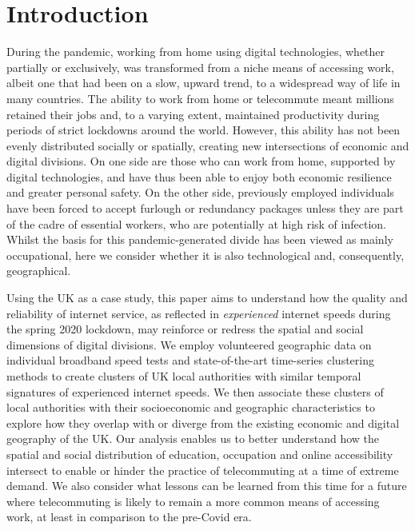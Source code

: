 \documentclass[]{interact}
\theoremstyle{plain}%
\theoremstyle{definition}
\theoremstyle{remark}
\begin{document}
\hypertarget{sec:1}{%
\section{Introduction}\label{sec:1}}

During the pandemic, working from home using digital technologies,
whether partially or exclusively, was transformed from a niche means of
accessing work, albeit one that had been on a slow, upward trend, to a
widespread way of life in many countries. The ability to work from home
or telecommute meant millions retained their jobs and, to a varying
extent, maintained productivity during periods of strict lockdowns
around the world. However, this ability has not been evenly distributed
socially or spatially, creating new intersections of economic and
digital divisions. On one side are those who can work from home,
supported by digital technologies, and have thus been able to enjoy both
economic resilience and greater personal safety. On the other side,
previously employed individuals have been forced to accept furlough or
redundancy packages unless they are part of the cadre of essential
workers, who are potentially at high risk of infection. Whilst the basis
for this pandemic-generated divide has been viewed as mainly
occupational, here we consider whether it is also technological and,
consequently, geographical.

Using the UK as a case study, this paper aims to understand how the
quality and reliability of internet service, as reflected in
\emph{experienced} internet speeds during the spring 2020 lockdown, may
reinforce or redress the spatial and social dimensions of digital
divisions. We employ volunteered geographic data on individual broadband
speed tests and state-of-the-art time-series clustering methods to
create clusters of UK local authorities with similar temporal signatures
of experienced internet speeds. We then associate these clusters of
local authorities with their socioeconomic and geographic
characteristics to explore how they overlap with or diverge from the
existing economic and digital geography of the UK. Our analysis enables
us to better understand how the spatial and social distribution of
education, occupation and online accessibility intersect to enable or
hinder the practice of telecommuting at a time of extreme demand. We
also consider what lessons can be learned from this time for a future
where telecommuting is likely to remain a more common means of accessing
work, at least in comparison to the pre-Covid era.
\end{document}
